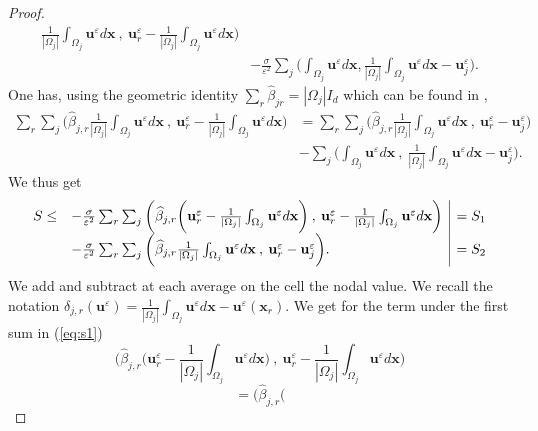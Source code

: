 \documentclass[a4paper,french,english,10pt]{article}
\newcommand\uu{\mathbf{u}}
\newcommand\be{\widehat{\beta}_{jr}}
\newcommand\eps{\varepsilon}
\newcommand\x{\mathbf{x}}
\begin{document}
\begin{proof}
\begin{equation*}
\begin{aligned}
\frac{1}{|\Omega_j|}\int_{\Omega_j} \textbf{u}^{\eps} d\x  \: , \:
\textbf{u}_r^{\eps}-\frac{1}{|\Omega_j|}\int_{\Omega_j} \textbf{u}^{\eps} d\x
\bigg)\\
&-\frac{\sigma}{\eps^2}\sum_j\bigg( \int_{\Omega_j}\textbf{u}^{\eps}d\x , 
\frac{1}{|\Omega_j|}  \int_{\Omega_j}\textbf{u}^{\eps}d\x -\textbf{u}^{\eps}_j
\bigg).
\end{aligned}
\end{equation*}
One has, using the geometric identity 
$\sum_r \be =|\Omega_j| I_d$ which can be found in \cite{glaceap,de10},
\begin{equation*}
 \begin{aligned}
  \sum_r \sum_j  \bigg( \widehat{\beta}_{j,r}
\frac{1}{|\Omega_j|}\int_{\Omega_j} \textbf{u}^{\eps} d\x  \: , \:
\textbf{u}_r^{\eps}-\frac{1}{|\Omega_j|}\int_{\Omega_j} \textbf{u}^{\eps} d\x
\bigg) &= \sum_r \sum_j  \bigg( \widehat{\beta}_{j,r}
\frac{1}{|\Omega_j|}\int_{\Omega_j} \textbf{u}^{\eps} d\x  \: , \:
\textbf{u}_r^{\eps}-\textbf{u}_j^{\eps} \bigg) \\
&-\sum_j  \bigg( \int_{\Omega_j} \textbf{u}^{\eps} d\x  \: , \:
\frac{1}{|\Omega_j|}\int_{\Omega_j} \textbf{u}^{\eps} d\x-\textbf{u}_j^{\eps}
\bigg).
 \end{aligned}
\end{equation*}
We thus get
\begin{equation}\label{eq:s1}
\begin{array}{ll | r}
S\leq &-\frac{\sigma}{\eps^2} \sum_r \sum_j  \bigg( \widehat{\beta}_{j,r}\bigg(
\textbf{u}_r^{\eps}- \frac{1}{|\Omega_j|}\int_{\Omega_j} 
\textbf{u}^{\eps} d\x\bigg ) 
\: , \: \textbf{u}_r^{\eps}-\frac{1}{|\Omega_j|}\int_{\Omega_j}
\textbf{u}^{\eps} d\x \bigg)
&=S_1
 \\
&-\frac{\sigma}{\eps^2} \sum_r \sum_j  \bigg( \widehat{\beta}_{j,r}
\frac{1}{|\Omega_j|}\int_{\Omega_j} \textbf{u}^{\eps} d\x  \: , \:
\textbf{u}_r^{\eps}-\textbf{u}_j^{\eps} \bigg). &=S_2
\end{array}
\end{equation}
We add and subtract at each average on the cell the nodal value. 
We recall the notation  
$\delta_{j,r}(\textbf{u}^{\eps})=\frac{1}{|\Omega_j|}\int_{\Omega_j}
\uu^{\eps} d\x-\textbf{u}^{\eps}(\textbf{x}_r)$.
We get for the term under the first sum in (\ref{eq:s1})
$$
\bigg( \widehat{\beta}_{j,r}\bigg(
\textbf{u}_r^{\eps}- \frac{1}{|\Omega_j|}\int_{\Omega_j} 
\textbf{u}^{\eps} d\x\bigg ) 
\: , \: \textbf{u}_r^{\eps}-\frac{1}{|\Omega_j|}\int_{\Omega_j}
\textbf{u}^{\eps} d\x \bigg)
$$
$$
=\bigg( \widehat{\beta}_{j,r}\bigg(
$$
\end{proof}
\end{document}
